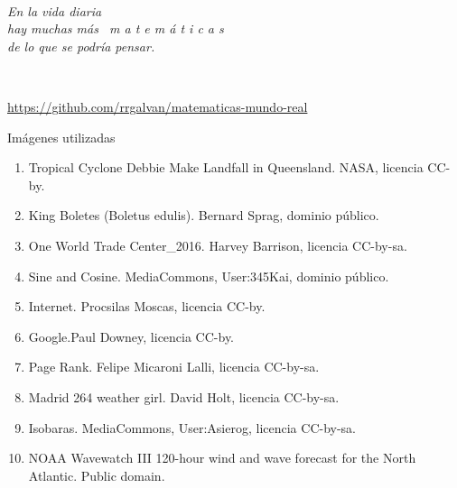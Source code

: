 \documentclass[
  unknownkeysallowed %
]{beamer}
\begin{document}
\begin{frame}{~}
  \begin{flushleft}\em
    En la vida diaria
    \\[1.2em]
    hay muchas más \ \alert{\large m a t e m á t i c a s}
    \\[1.2em]
    de lo que se podría pensar.
  \end{flushleft}
  \bigskip
  \begin{flushright}
    \Huge{}
  \end{flushright}
  \vfill
  \vfill
  ~
  \begin{flushright}
    \color{gray}\scriptsize\url{https://github.com/rrgalvan/matematicas-mundo-real}
  \end{flushright}
\end{frame}

\begin{frame}{Imágenes utilizadas}
  \scriptsize
  \begin{enumerate}
  \item Tropical Cyclone Debbie Make Landfall in Queensland. NASA, licencia CC-by.
  \item King Boletes (Boletus edulis). Bernard Sprag, dominio público.
  \item One World Trade Center\_2016. Harvey Barrison, licencia CC-by-sa.
  \item Sine and Cosine. MediaCommons, User:345Kai, dominio público.
  \item Internet. Procsilas Moscas, licencia CC-by.
  \item Google.Paul Downey, licencia CC-by.
  \item Page Rank. Felipe Micaroni Lalli, licencia CC-by-sa.
  \item Madrid 264 weather girl. David Holt, licencia CC-by-sa.
  \item Isobaras. MediaCommons, User:Asierog, licencia CC-by-sa.
  \item NOAA Wavewatch III 120-hour wind and wave forecast for the
    North Atlantic. Public domain.
  \end{enumerate}
\end{frame}
\end{document}

